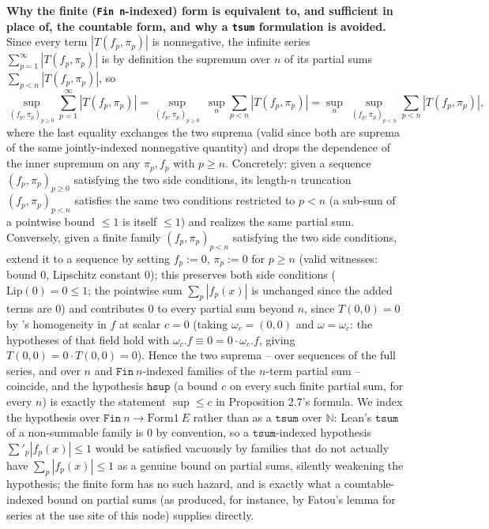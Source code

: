 \begin{definition}
  \textbf{Why the finite (\texttt{Fin n}-indexed) form is equivalent to, and sufficient in place
  of, the countable form, and why a \texttt{tsum} formulation is avoided.} Since every term
  $|T(f_p,\pi_p)|$ is nonnegative, the infinite series $\sum_{p=1}^\infty |T(f_p,\pi_p)|$ is by
  definition the supremum over $n$ of its partial sums $\sum_{p<n} |T(f_p,\pi_p)|$, so
  \[
    \sup_{(f_p,\pi_p)_{p\ge 0}} \sum_{p=1}^\infty |T(f_p,\pi_p)|
    = \sup_{(f_p,\pi_p)_{p \ge 0}} \ \sup_{n} \sum_{p<n} |T(f_p,\pi_p)|
    = \sup_{n} \ \sup_{(f_p,\pi_p)_{p<n}} \sum_{p<n} |T(f_p,\pi_p)|
    ,
  \]
  where the last equality exchanges the two suprema (valid since both are suprema of the same
  jointly-indexed nonnegative quantity) and drops the dependence of the inner supremum on any
  $\pi_p,f_p$ with $p \ge n$. Concretely: given a sequence $(f_p,\pi_p)_{p\ge 0}$ satisfying the
  two side conditions, its length-$n$ truncation $(f_p,\pi_p)_{p<n}$ satisfies the same two
  conditions restricted to $p<n$ (a sub-sum of a pointwise bound $\le 1$ is itself $\le 1$) and
  realizes the same partial sum. Conversely, given a finite family $(f_p,\pi_p)_{p<n}$ satisfying
  the two side conditions, extend it to a sequence by setting $f_p := 0$, $\pi_p := 0$ for $p \ge
  n$ (valid witnesses: bound $0$, Lipschitz constant $0$); this preserves both side conditions
  ($\mathrm{Lip}(0) = 0 \le 1$; the pointwise sum $\sum_p |f_p(x)|$ is unchanged since the added
  terms are $0$) and contributes $0$ to every partial sum beyond $n$, since $T(0,0) = 0$ by
  's homogeneity in $f$ at scalar $c = 0$ (taking $\omega_c = (0,0)$ and
  $\omega = \omega_c$: the hypotheses of that field hold with $\omega_c.f \equiv 0 = 0 \cdot
  \omega_c.f$, giving $T(0,0) = 0 \cdot T(0,0) = 0$). Hence the two suprema -- over sequences of
  the full series, and over $n$ and $\mathtt{Fin}\ n$-indexed families of the $n$-term partial sum
  -- coincide, and the hypothesis $\mathtt{hsup}$ (a bound $c$ on every such finite partial sum,
  for every $n$) is exactly the statement $\sup \le c$ in Proposition 2.7's formula. We index the
  hypothesis over $\mathtt{Fin}\ n \to \mathrm{Form1}\ E$ rather than as a $\mathtt{tsum}$ over
  $\mathbb{N}$: Lean's $\mathtt{tsum}$ of a non-summable family is $0$ by convention, so a
  $\mathtt{tsum}$-indexed hypothesis $\sum'_p |f_p(x)| \le 1$ would be satisfied vacuously by
  families that do not actually have $\sum_p |f_p(x)| \le 1$ as a genuine bound on partial sums,
  silently weakening the hypothesis; the finite form has no such hazard, and is exactly what a
  countable-indexed bound on partial sums (as produced, for instance, by Fatou's lemma for series
  at the use site of this node) supplies directly.


\end{definition}
